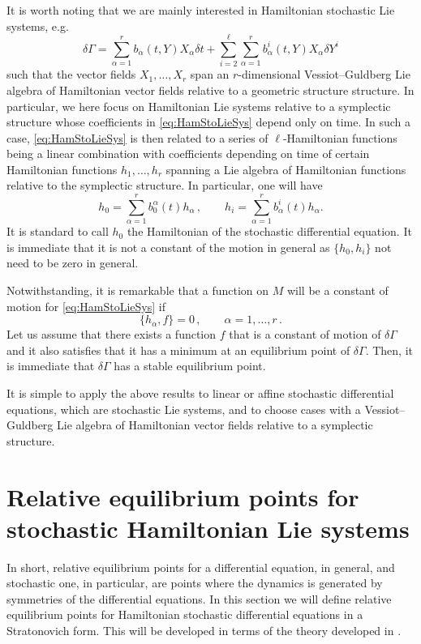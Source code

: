 \documentclass[11pt]{article}
\theoremstyle{plain}
\theoremstyle{definition}
\begin{document}
It is worth noting that we are mainly interested in Hamiltonian stochastic Lie systems, e.g.
\begin{equation}\label{eq:HamStoLieSys}
\delta \Gamma=\sum_{\alpha=1}^rb_\alpha(t,  Y)X_\alpha \delta t+\sum_{i=2}^\ell\sum_{\alpha=1}^rb^i_\alpha(t, Y)X_\alpha\delta Y^i
\end{equation}
such that the vector fields $X_1,\ldots,X_r$ span an $r$-dimensional Vessiot--Guldberg Lie algebra of Hamiltonian vector fields relative to a geometric structure structure. In particular, we here focus on Hamiltonian Lie systems relative to a symplectic structure whose coefficients in \eqref{eq:HamStoLieSys} depend only on time. In such a case, \eqref{eq:HamStoLieSys} is then related to a series of $\ell$-Hamiltonian functions being a linear combination with coefficients depending on time of certain Hamiltonian functions $h_1,\ldots,h_r$ spanning a Lie algebra of Hamiltonian functions relative to the symplectic structure. In particular, one will have
$$
h_0=\sum_{\alpha=1}^rb^\alpha_0(t)h_\alpha\,,\qquad h_i=\sum_{\alpha=1}^rb_\alpha^i(t)h_\alpha.
$$
It is standard to call $h_0$ the Hamiltonian of the stochastic differential equation. It is immediate that it is not a constant of the motion in general as $\{h_0,h_i\}$ not need to be zero in general. 

Notwithstanding, it is remarkable that a function on $M$ will be a constant of motion for \eqref{eq:HamStoLieSys} if 
$$
\{h_\alpha,f\}=0\,,\qquad \alpha=1,\ldots,r\,.
$$
Let us assume that there exists a function $f$ that is a constant of motion of $\delta \Gamma$ and it also satisfies that it has a minimum at an equilibrium point of $\delta \Gamma$. Then, it is immediate that $\delta\Gamma$ has a stable equilibrium point.

It is simple to apply the above results to linear or affine stochastic differential equations, which are stochastic Lie systems, and to choose cases with a Vessiot--Guldberg Lie algebra of Hamiltonian vector fields relative to a symplectic structure.

\section{Relative equilibrium points for stochastic Hamiltonian Lie systems}\label{Sec:Relative_Equilibrium_Stochastic_Differential}

In short, relative equilibrium points for a differential equation, in general, and stochastic one, in particular, are points where the dynamics is generated by symmetries of the differential equations. In this section we will define relative equilibrium points for Hamiltonian stochastic differential equations in a Stratonovich form. This will be developed in terms of the theory developed in \cite{LO08}. 
\end{document}
